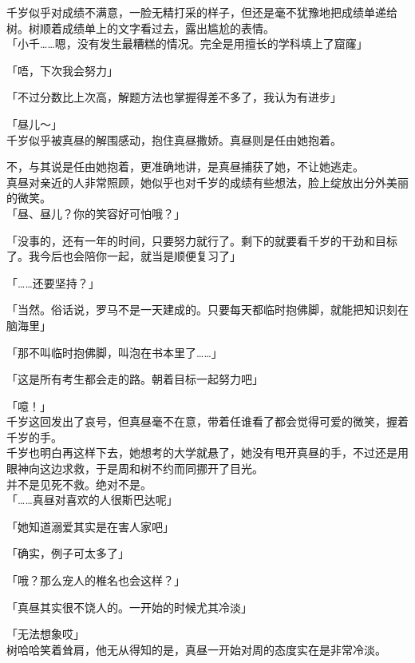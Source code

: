 千岁似乎对成绩不满意，一脸无精打采的样子，但还是毫不犹豫地把成绩单递给树。树顺着成绩单上的文字看过去，露出尴尬的表情。\\

「小千……嗯，没有发生最糟糕的情况。完全是用擅长的学科填上了窟窿」

「唔，下次我会努力」

「不过分数比上次高，解题方法也掌握得差不多了，我认为有进步」

「昼儿～」\\

千岁似乎被真昼的解围感动，抱住真昼撒娇。真昼则是任由她抱着。

不，与其说是任由她抱着，更准确地讲，是真昼捕获了她，不让她逃走。\\

真昼对亲近的人非常照顾，她似乎也对千岁的成绩有些想法，脸上绽放出分外美丽的微笑。\\

「昼、昼儿？你的笑容好可怕哦？」

「没事的，还有一年的时间，只要努力就行了。剩下的就要看千岁的干劲和目标了。我今后也会陪你一起，就当是顺便复习了」

「……还要坚持？」

「当然。俗话说，罗马不是一天建成的。只要每天都临时抱佛脚，就能把知识刻在脑海里」

「那不叫临时抱佛脚，叫泡在书本里了……」

「这是所有考生都会走的路。朝着目标一起努力吧」

「噫！」\\

千岁这回发出了哀号，但真昼毫不在意，带着任谁看了都会觉得可爱的微笑，握着千岁的手。\\

千岁也明白再这样下去，她想考的大学就悬了，她没有甩开真昼的手，不过还是用眼神向这边求救，于是周和树不约而同挪开了目光。\\

并不是见死不救。绝对不是。\\

「……真昼对喜欢的人很斯巴达呢」

「她知道溺爱其实是在害人家吧」

「确实，例子可太多了」

「哦？那么宠人的椎名也会这样？」

「真昼其实很不饶人的。一开始的时候尤其冷淡」

「无法想象哎」\\

树哈哈笑着耸肩，他无从得知的是，真昼一开始对周的态度实在是非常冷淡。\\

